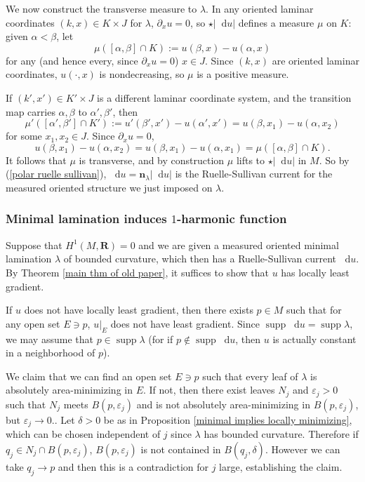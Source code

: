 \documentclass[reqno,11pt]{amsart}
\newcommand{\RR}{\mathbf{R}}
\newcommand*\dif{\mathop{}\!\mathrm{d}}
\DeclareMathOperator{\supp}{supp}
\newcommand{\normal}{\mathbf n}
\theoremstyle{definition}
\numberwithin{equation}{section}
\begin{document}
We now construct the transverse measure to $\lambda$.
In any oriented laminar coordinates $(k, x) \in K \times J$ for $\lambda$, $\partial_x u = 0$, so $\star |\dif u|$ defines a measure $\mu$ on $K$: given $\alpha < \beta$, let
$$\mu([\alpha, \beta] \cap K) := u(\beta, x) - u(\alpha, x)$$
for any (and hence every, since $\partial_x u = 0$) $x \in J$.
Since $(k, x)$ are oriented laminar coordinates, $u(\cdot, x)$ is nondecreasing, so $\mu$ is a positive measure.

If $(k', x') \in K' \times J$ is a different laminar coordinate system, and the transition map carries $\alpha, \beta$ to $\alpha', \beta'$, then
$$\mu'([\alpha', \beta'] \cap K') := u'(\beta', x') - u(\alpha', x') = u(\beta, x_1) - u(\alpha, x_2)$$
for some $x_1, x_2 \in J$. Since $\partial_x u = 0$,
$$u(\beta, x_1) - u(\alpha, x_2) = u(\beta, x_1) - u(\alpha, x_1) = \mu([\alpha, \beta] \cap K).$$
It follows that $\mu$ is transverse, and by construction $\mu$ lifts to $\star |\dif u|$ in $M$.
So by (\ref{polar ruelle sullivan}), $\dif u = \normal_\lambda |\dif u|$ is the Ruelle-Sullivan current for the measured oriented structure we just imposed on $\lambda$.


\subsubsection{Minimal lamination induces \texorpdfstring{$1$-harmonic}{one-harmonic} function}
Suppose that $H^1(M, \RR) = 0$ and we are given a measured oriented minimal lamination $\lambda$ of bounded curvature, which then has a Ruelle-Sullivan current $\dif u$.
By Theorem \ref{main thm of old paper}, it suffices to show that $u$ has locally least gradient.

If $u$ does not have locally least gradient, then there exists $p \in M$ such that for any open set $E \ni p$, $u|_E$ does not have least gradient.
Since $\supp \dif u = \supp \lambda$, we may assume that $p \in \supp \lambda$ (for if $p \notin \supp \dif u$, then $u$ is actually constant in a neighborhood of $p$).

We claim that we can find an open set $E \ni p$ such that every leaf of $\lambda$ is absolutely area-minimizing in $E$.
If not, then there exist leaves $N_j$ and $\varepsilon_j > 0$ such that $N_j$ meets $B(p, \varepsilon_j)$ and is not absolutely area-minimizing in $B(p, \varepsilon_j)$, but $\varepsilon_j \to 0$..
Let $\delta > 0$ be as in Proposition \ref{minimal implies locally minimizing}, which can be chosen independent of $j$ since $\lambda$ has bounded curvature.
Therefore if $q_j \in N_j \cap B(p, \varepsilon_j)$, $B(p, \varepsilon_j)$ is not contained in $B(q_j, \delta)$.
However we can take $q_j \to p$ and then this is a contradiction for $j$ large, establishing the claim.
\end{document}
